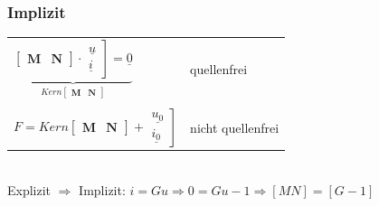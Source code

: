 \documentclass[a4paper,twocolumn,10pt]{article}
\begin{document}
\subsubsection*{Implizit}
\begin{tabular}{ll}
$\underbrace{\begin{bmatrix}\textbf{M} & \textbf{N}\end{bmatrix}\cdot \left.\begin{matrix}\underline{u}\\\underline{i}\end{matrix}\right]=\underline{0}}_{Kern\begin{bmatrix}\textbf{M} & \textbf{N}\end{bmatrix}}$ & quellenfrei\\\\
$F=Kern\begin{bmatrix}\textbf{M} & \textbf{N}\end{bmatrix}+\left.\begin{matrix}\underline{u_0}\\\underline{i_0}\end{matrix}\right]$ & nicht quellenfrei
\end{tabular}\\
Explizit $\Rightarrow$ Implizit: $i=Gu\Rightarrow 0=Gu-1\Rightarrow [M N]=[G -1]$
\end{document}
